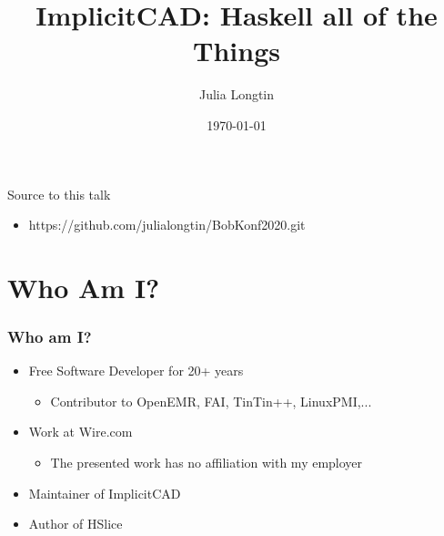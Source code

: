 \documentclass{beamer}
\title[BobKonf]{ImplicitCAD: Haskell all of the Things} %
\author{Julia Longtin} %
\institute[ImplicitCAD] %
{
ImplicitCAD Project \\ %
\medskip
\textit{julia.longtin@gmail.com} %
}
\date{\today} %
\begin{document}
\begin{frame}
\titlepage %
\begin{block}{Source to this talk}
\begin{itemize}
\item https://github.com/julialongtin/BobKonf2020.git
\end{itemize}
\end{block}
\end{frame}



\section{Who Am I?} %

\begin{frame}
\frametitle{Who am I?}
\begin{itemize}
\item Free Software Developer for 20+ years
  \begin{itemize}
  \item Contributor to OpenEMR, FAI, TinTin++, LinuxPMI,...
  \end{itemize}
\item Work at Wire.com
  \begin{itemize}
  \item The presented work has no affiliation with my employer
  \end{itemize}
\item Maintainer of ImplicitCAD
\item Author of HSlice
\end{itemize}
\end{frame}
\end{document}
